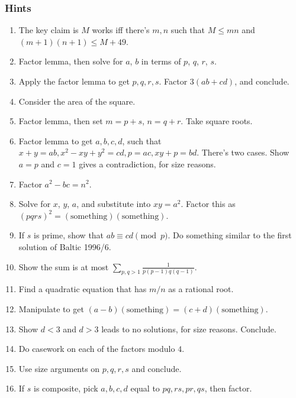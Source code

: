 \documentclass[11pt,paper=letter]{scrartcl}
\begin{document}
\newpage

\subsubsection*{Hints}

\begin{enumerate}

\item \label{h:15} The key claim is $M$ works iff there's $m, n$ such that $M \le mn$ and $(m + 1)(n + 1) \le M + 49$. %
\item \label{h:3} Factor lemma, then solve for $a$, $b$ in terms of $p$, $q$, $r$, $s$. %
\item \label{h:7} Apply the factor lemma to get $p, q, r, s$. Factor $3(ab + cd)$, and conclude. %
\item \label{h:2} Consider the area of the square. %
\item \label{h:4} Factor lemma, then set $m = p + s$, $n = q + r$. Take square roots. %
\item \label{h:19} Factor lemma to get $a, b, c, d$, such that $x + y = ab, x^2 - xy + y^2 = cd, p = ac, xy + p = bd$. There's two cases. Show $a = p$ and $c = 1$ gives a contradiction, for size reasons. %
\item \label{h:1} Factor $a^2 - bc = n^2$. %
\item \label{h:17} Solve for $x$, $y$, $a$, and substitute into $xy = a^2$. Factor this as $(pqrs)^2 = (\text{something})(\text{something})$. %
\item \label{h:11} If $s$ is prime, show that $ab \equiv cd \pmod p$. Do something similar to the first solution of Baltic 1996/6. %
\item \label{h:9} Show the sum is at most $\displaystyle \sum_{p, q > 1} \frac{1}{p(p - 1)q(q - 1)}$. %
\item \label{h:5} Find a quadratic equation that has $m/n$ as a rational root. %
\item \label{h:6} Manipulate to get $(a - b)(\text{something}) = (c + d)(\text{something})$. %
\item \label{h:21} Show $d < 3$ and $d > 3$ leads to no solutions, for size reasons. Conclude. %
\item \label{h:13} Do casework on each of the factors modulo $4$. %
\item \label{h:18} Use size arguments on $p, q, r, s$ and conclude. %
\item \label{h:10} If $s$ is composite, pick $a, b, c, d$ equal to $pq, rs, pr, qs$, then factor. %

\end{enumerate}
\end{document}
